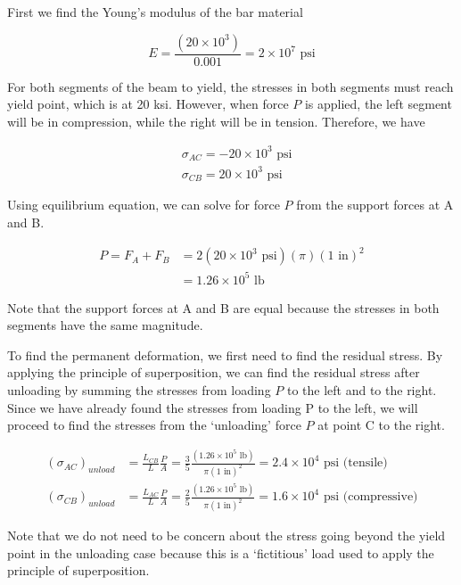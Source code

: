 \documentclass[
10pt,
a4paper,
openany,
svgnames,
]{kaobook} %
\begin{document}
\begin{solution}
  
  First we find the Young’s modulus of the bar material
  
  \[E = \frac{{(20 \times {{10}^3})}}{{0.001}} = 2 \times {10^7} \text{ psi}\]	
  
  For both segments of the beam to yield, the stresses in both segments must reach yield point, which is at 20 ksi. However, when force $P$ is applied, the left segment will be in compression, while the right will be in tension. Therefore, we have
  
  \begin{align*}
    &{\sigma _{AC}} =  - 20 \times {10^3} \text{ psi} \\
    &{\sigma _{CB}} = 20 \times {10^3} \text{ psi}
  \end{align*}	

  Using equilibrium equation, we can solve for force $P$ from the support forces at A and B.
  
  \begin{align*}
    P = {F_A} + {F_B} &= 2(20 \times {10^3} \text{ psi})(\pi ){(1 \text{ in})^2} \\ 
                      &= 1.26 \times {10^5} \text{ lb}
  \end{align*}	
  
  Note that the support forces at A and B are equal because the stresses in both segments have the same magnitude.
  
  To find the permanent deformation, we first need to find the residual stress. By applying the principle of superposition, we can find the residual stress after unloading by summing the stresses from loading $P$ to the left and to the right. Since we have already found the stresses from loading P to the left, we will proceed to find the stresses from the ‘unloading’ force $P$ at point C to the right.
  
  \begin{align*}
    (\sigma _{AC})_{unload} &= \frac{L_{CB}}{L}\frac{P}{A} = \frac{3}{5} \frac{(1.26 \times 10^5 \text{ lb})}{\pi {(1 \text{ in})^2}} = 2.4 \times {10^4} \text{ psi} \text{ (tensile)} \\
  (\sigma _{CB})_{unload} &= \frac{L_{AC}}{L}\frac{P}{A} = \frac{2}{5} \frac{(1.26 \times 10^5 \text{ lb})}{\pi (1 \text{ in})^2} = 1.6 \times {10^4} \text{ psi} \text{ (compressive)}
  \end{align*}	
  
  Note that we do not need to be concern about the stress going beyond the yield point in the unloading case because this is a ‘fictitious’ load used to apply the principle of superposition.
  

\end{solution}
\end{document}
